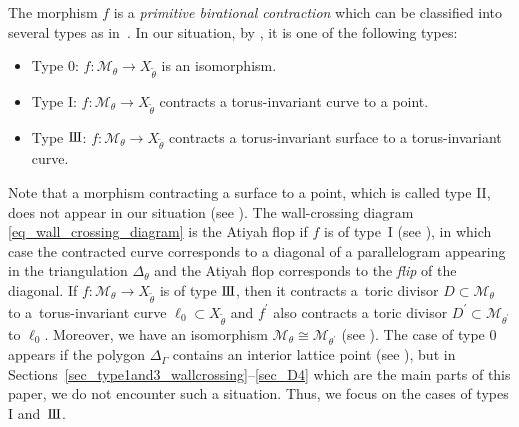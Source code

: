 \documentclass[10pt,a4paper]{amsart}
\numberwithin{equation}{section}
\theoremstyle{definition}
\newcommand{\calM}{\mathcal{M}}
\newcommand{\typeII}{{\rm I\hspace{-0.7pt}I}}
\newcommand{\typeIII}{{\rm I\hspace{-0.7pt}I\hspace{-0.7pt}I}}
\begin{document}
The morphism $f$ is a \emph{primitive birational contraction} which can be classified into several types as in~\cite{Wil_walltypes}.
In our situation, by \cite[Section~11]{IU_anycrepant}, it is one of the following types:
\begin{itemize}\itemsep=0pt
\item Type $0$: $f\colon \calM_\theta\rightarrow X_{\tilde{\theta}}$ is an isomorphism.
\item Type I: $f\colon \calM_\theta\rightarrow X_{\tilde{\theta}}$ contracts a torus-invariant curve to a point.
\item Type $\typeIII$: $f\colon \calM_\theta\rightarrow X_{\tilde{\theta}}$ contracts a torus-invariant surface to a torus-invariant curve.
\end{itemize}
Note that a morphism contracting a surface to a point, which is called type \typeII, does not appear in our situation (see \cite[Lemma~10.5]{IU_anycrepant}).
The wall-crossing diagram \eqref{eq_wall_crossing_diagram} is the Atiyah flop if $f$ is of type~I (see \cite[Lemma~11.26]{IU_anycrepant}),
in which case the contracted curve corresponds to a diagonal of a parallelogram appearing in the triangulation $\Delta_\theta$ and
the Atiyah flop corresponds to the \emph{flip} of the diagonal.
If $f\colon \calM_\theta\rightarrow X_{\tilde{\theta}}$ is of type $\typeIII$, then it contracts a~toric divisor $D\subset\calM_\theta$ to a~torus-invariant curve $\ell_0\subset X_{\tilde{\theta}}$ and $f^\prime$ also contracts a toric divisor $D^\prime\subset\calM_{\theta^\prime}$ to $\ell_0$.
Moreover, we have an isomorphism $\calM_\theta\cong\calM_{\theta^\prime}$ (see \cite[Lemma~11.29]{IU_anycrepant}).
The case of type $0$ appears if the polygon $\Delta_\Gamma$ contains an interior lattice point (see \cite[Section~11.1]{IU_anycrepant}),
but in Sections~\ref{sec_type1and3_wallcrossing}--\ref{sec_D4} which are the main parts of this paper, we do not encounter such a situation.
Thus, we focus on the cases of types I and~$\typeIII$.
\end{document}
